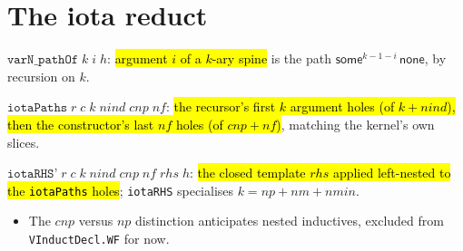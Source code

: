 \section{The iota reduct}

\begin{definition}
\label{def:pattern-varn-pathof}
\leanok
{} 

 $\texttt{varN\_pathOf}\;k\;i\;h$: \hl{argument $i$ of a $k$-ary spine} is the
path $\mathsf{some}^{k-1-i}\,\mathsf{none}$, by recursion on $k$.
\end{definition}

\begin{definition}
\label{def:pattern-iota-paths}
\leanok
{} 

 $\texttt{iotaPaths}\;r\;c\;k\;nind\;cnp\;nf$: \hl{the recursor's first $k$
argument holes (of $k{+}nind$), then the constructor's last $nf$ holes (of $cnp{+}nf$)},
matching the kernel's own slices.
\end{definition}

\begin{definition}
\label{def:pattern-iota-rhs}
\leanok
{} 

 $\texttt{iotaRHS'}\;r\;c\;k\;nind\;cnp\;nf\;rhs\;h$: \hl{the closed template
$rhs$ applied left-nested to the \texttt{iotaPaths} holes}; \texttt{iotaRHS} specialises
$k=np+nm+nmin$.
\begin{itemize}
\item The $cnp$ versus $np$ distinction anticipates nested inductives, excluded from
\texttt{VInductDecl.WF} for now.
\end{itemize}
\end{definition}

